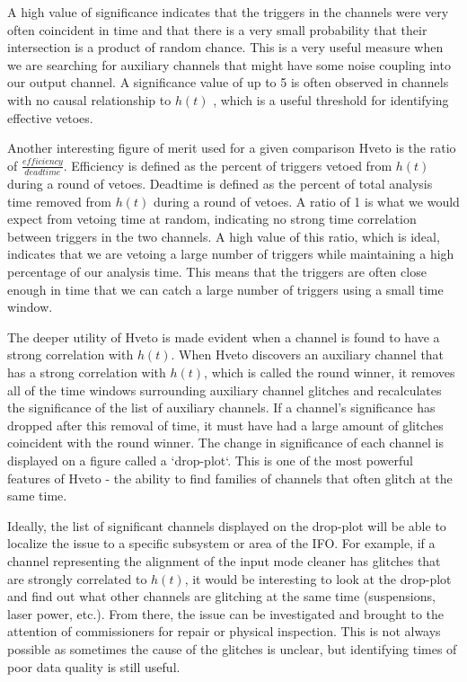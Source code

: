 A high value of significance indicates that the triggers in the channels 
were very often coincident in time and that there is a very small probability 
that their intersection is a product of random chance. This is a very useful 
measure when we are searching for auxiliary channels that might have some 
noise coupling into our output channel. A significance value of up to 5 is 
often observed in channels with no causal relationship to $h(t)$ \cite{Smith:2011}, 
which is a useful threshold for identifying effective vetoes.

Another interesting figure of merit used for a given comparison Hveto is 
the ratio of $\frac{efficiency}{deadtime}$. Efficiency is defined as the 
percent of triggers vetoed from $h(t)$ during a round of vetoes. Deadtime 
is defined as the percent of total analysis time removed from $h(t)$ during 
a round of vetoes. A ratio of 1 is what we would expect from vetoing time 
at random, indicating no strong time correlation between triggers in the 
two channels. A high value of this ratio, which is ideal, indicates that 
we are vetoing a large number of triggers while maintaining a high percentage 
of our analysis time. This means that the triggers are often close enough 
in time that we can catch a large number of triggers using a small time window.

The deeper utility of Hveto is made evident when a channel is found to have 
a strong correlation with $h(t)$. 
When Hveto discovers an auxiliary channel that has a strong correlation 
with $h(t)$, which is called the round winner, it removes all of the time 
windows surrounding 
auxiliary channel glitches and recalculates the significance of the list of 
auxiliary channels. If a channel's significance has dropped after this removal 
of time, it must have had a large amount of glitches coincident with the 
round winner. The change in significance of each channel is displayed on a 
figure called a `drop-plot`. This is one of the most powerful features of Hveto
 - the ability to find families of channels that often glitch at the same time. 

Ideally, the list of significant channels displayed on the drop-plot will be 
able to localize the issue to a specific subsystem or area of the IFO. 
For example, if a channel representing the alignment of the input mode 
cleaner has glitches that are strongly correlated to $h(t)$, it would be 
interesting to look at the drop-plot and find out what other channels are 
glitching at the same time (suspensions, laser power, etc.).
From there, the issue can be investigated and brought to the attention of 
commissioners for repair or physical inspection. This is not always possible 
as sometimes the cause of the glitches is unclear, but identifying times of 
poor data quality is still useful.

